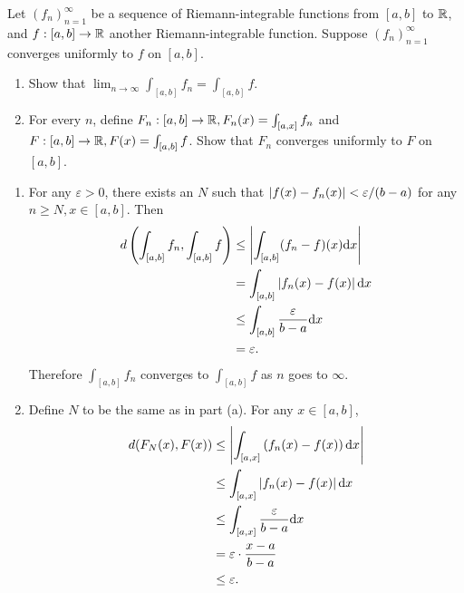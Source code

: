 \documentclass{article}
\begin{document}
\bigskip
\begin{prob}
    Let $(f_n)_{n=1}^\infty$ be a sequence of Riemann-integrable functions from $[a,b]$ to $\mathbb{R}$, and $f: [a,b] \rightarrow \mathbb{R}$ another Riemann-integrable function. Suppose $(f_n)_{n=1}^\infty$ converges uniformly to $f$ on $[a,b]$.
    \begin{enumerate}[label=(\alph*)]
        \item Show that $\lim_{n \rightarrow \infty} \int_{[a,b]} f_n = \int_{[a,b]} f$.
        \item For every $n$, define $F_n : [a,b] \rightarrow \mathbb{R}, F_n(x) = \int_{[a,x]} f_n$ and $F: [a,b] \rightarrow \mathbb{R}, F(x) = \int_{[a,b]} f$. Show that $F_n$ converges uniformly to $F$ on $[a,b]$.
    \end{enumerate}
\end{prob}
\begin{enumerate}[label=(\alph*)]
    \item For any $\varepsilon > 0$, there exists an $N$ such that $\left\lvert f(x)-f_n(x) \right\rvert< \varepsilon/(b-a)$ for any $n\geq N, x \in [a,b]$. Then \begin{align*}
            d \left( \int_{[a,b]} f_n, \int_{[a,b]} f \right) &\leq \left\lvert \int_{[a,b]} (f_n-f)(x) \mathrm{d} x \right\rvert \\
                                                              &= \int_{[a,b]} \left\lvert f_n(x)-f(x) \right\rvert \mathrm{d} x \\
                                                              &\leq \int_{[a,b]} \frac{\varepsilon}{b-a} \mathrm{d} x \\
                                                              &= \varepsilon.
    \end{align*}
    Therefore $\int_{[a,b]} f_n$ converges to $\int_{[a,b]} f$ as $n$ goes to $\infty$.
\item Define $N$ to be the same as in part (a). For any $x \in [a,b]$, \begin{align*}
        d(F_N(x),F(x)) &\leq \left\lvert \int_{[a,x]} \left( f_n(x)-f(x) \right) \mathrm{d} x \right\rvert \\
                       &\leq \int_{[a,x]} \left\lvert f_n(x)-f(x) \right\rvert \mathrm{d} x \\
                       &\leq \int_{[a,x]} \frac{\varepsilon}{b-a} \mathrm{d} x \\
                       &= \varepsilon \cdot \frac{x-a}{b-a} \\
                       &\leq \varepsilon.
\end{align*}
\end{enumerate}
\end{document}
